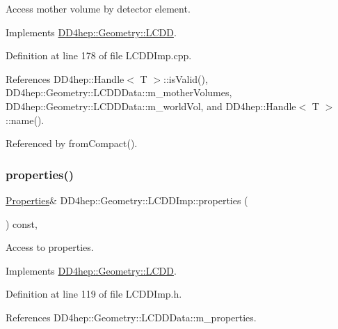 Access mother volume by detector element. 



Implements \hyperlink{class_d_d4hep_1_1_geometry_1_1_l_c_d_d_ad239fb24b7d6eb41abf697f2710ad6a3}{D\+D4hep\+::\+Geometry\+::\+L\+C\+DD}.



Definition at line 178 of file L\+C\+D\+D\+Imp.\+cpp.



References D\+D4hep\+::\+Handle$<$ T $>$\+::is\+Valid(), D\+D4hep\+::\+Geometry\+::\+L\+C\+D\+D\+Data\+::m\+\_\+mother\+Volumes, D\+D4hep\+::\+Geometry\+::\+L\+C\+D\+D\+Data\+::m\+\_\+world\+Vol, and D\+D4hep\+::\+Handle$<$ T $>$\+::name().



Referenced by from\+Compact().

\hypertarget{class_d_d4hep_1_1_geometry_1_1_l_c_d_d_imp_af2cb6b9930250633970547bba6c93e87}{}\label{class_d_d4hep_1_1_geometry_1_1_l_c_d_d_imp_af2cb6b9930250633970547bba6c93e87} 
\subsubsection{\texorpdfstring{properties()}{properties()}}
{\footnotesize\ttfamily \hyperlink{class_d_d4hep_1_1_geometry_1_1_l_c_d_d_a89096744868821bf5dcb0c0560b348c9}{Properties}\& D\+D4hep\+::\+Geometry\+::\+L\+C\+D\+D\+Imp\+::properties (\begin{DoxyParamCaption}{ }\end{DoxyParamCaption}) const\hspace{0.3cm}{\ttfamily [inline]}, {\ttfamily [virtual]}}



Access to properties. 



Implements \hyperlink{class_d_d4hep_1_1_geometry_1_1_l_c_d_d_a15fac6166c5a16968cf9f60b515f4125}{D\+D4hep\+::\+Geometry\+::\+L\+C\+DD}.



Definition at line 119 of file L\+C\+D\+D\+Imp.\+h.



References D\+D4hep\+::\+Geometry\+::\+L\+C\+D\+D\+Data\+::m\+\_\+properties.

\hypertarget{class_d_d4hep_1_1_geometry_1_1_l_c_d_d_imp_a96ec876212352ee837eb6358e7c55333}{}\label{class_d_d4hep_1_1_geometry_1_1_l_c_d_d_imp_a96ec876212352ee837eb6358e7c55333} 
